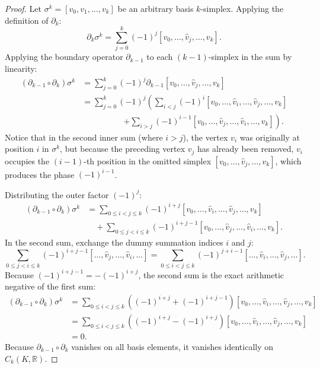 \begin{proof}
Let $\sigma^k = [v_0, v_1, \dots, v_k]$ be an arbitrary basis $k$-simplex. Applying the definition of $\partial_k$:
\begin{equation}
\partial_k \sigma^k = \sum_{j=0}^k (-1)^j [v_0, \dots, \hat{v}_j, \dots, v_k].
\end{equation}
Applying the boundary operator $\partial_{k-1}$ to each $(k-1)$-simplex in the sum by linearity:
\begin{align}
(\partial_{k-1} \circ \partial_k) \sigma^k &= \sum_{j=0}^k (-1)^j \partial_{k-1} [v_0, \dots, \hat{v}_j, \dots, v_k] \nonumber \\
&= \sum_{j=0}^k (-1)^j \left( \sum_{i < j} (-1)^i [v_0, \dots, \hat{v}_i, \dots, \hat{v}_j, \dots, v_k] \right. \nonumber \\
&\qquad\qquad\quad \left. + \sum_{i > j} (-1)^{i-1} [v_0, \dots, \hat{v}_j, \dots, \hat{v}_i, \dots, v_k] \right).
\end{align}
Notice that in the second inner sum (where $i > j$), the vertex $v_i$ was originally at position $i$ in $\sigma^k$, but because the preceding vertex $v_j$ has already been removed, $v_i$ occupies the $(i-1)$-th position in the omitted simplex $[v_0, \dots, \hat{v}_j, \dots, v_k]$, which produces the phase $(-1)^{i-1}$.

Distributing the outer factor $(-1)^j$:
\begin{align}
(\partial_{k-1} \circ \partial_k) \sigma^k &= \sum_{0 \le i < j \le k} (-1)^{i+j} [v_0, \dots, \hat{v}_i, \dots, \hat{v}_j, \dots, v_k] \nonumber \\
&\quad + \sum_{0 \le j < i \le k} (-1)^{i+j-1} [v_0, \dots, \hat{v}_j, \dots, \hat{v}_i, \dots, v_k].
\end{align}
In the second sum, exchange the dummy summation indices $i$ and $j$:
\begin{equation}
\sum_{0 \le j < i \le k} (-1)^{i+j-1} [\dots, \hat{v}_j, \dots, \hat{v}_i, \dots] = \sum_{0 \le i < j \le k} (-1)^{j+i-1} [\dots, \hat{v}_i, \dots, \hat{v}_j, \dots].
\end{equation}
Because $(-1)^{i+j-1} = -(-1)^{i+j}$, the second sum is the exact arithmetic negative of the first sum:
\begin{align}
(\partial_{k-1} \circ \partial_k) \sigma^k &= \sum_{0 \le i < j \le k} \left( (-1)^{i+j} + (-1)^{i+j-1} \right) [v_0, \dots, \hat{v}_i, \dots, \hat{v}_j, \dots, v_k] \nonumber \\
&= \sum_{0 \le i < j \le k} \left( (-1)^{i+j} - (-1)^{i+j} \right) [v_0, \dots, \hat{v}_i, \dots, \hat{v}_j, \dots, v_k] \nonumber \\
&= 0.
\end{align}
Because $\partial_{k-1} \circ \partial_k$ vanishes on all basis elements, it vanishes identically on $C_k(K, \mathbb{R})$.
\end{proof}

